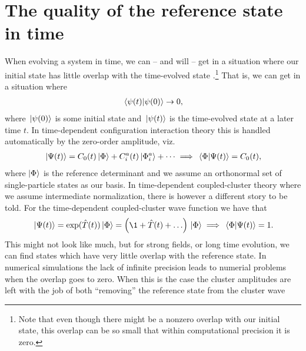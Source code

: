    \section{The quality of the reference state in time}
        \label{sec:cc-phase}
        When evolving a system in time, we can -- and will -- get in a
        situation where our initial state has little overlap with the
        time-evolved state \cite{pedersen2018symplectic}.\footnote{%
            Note that even though there might be a nonzero overlap with our
            initial state, this overlap can be so small that within
            computational precision it is zero.
        }
        That is, we can get in a situation where
        \begin{align}
            \braket*{\psi(t)}{\psi(0)} \to 0,
        \end{align}
        where $\ket*{\psi(0)}$ is some initial state and $\ket*{\psi(t)}$ is
        the time-evolved state at a later time $t$.
        In time-dependent configuration interaction theory this is handled
        automatically by the zero-order amplitude, viz.
        \begin{gather}
            \ket*{\Psi(t)}
            = C_0(t)\ket*{\Phi}
            + C^{a}_{i}(t)\ket*{\Phi^{a}_{i}}
            + \dots
            \implies
            \braket*{\Phi}{\Psi(t)} = C_0(t),
        \end{gather}
        where $\ket{\Phi}$ is the reference determinant and we assume an
        orthonormal set of single-particle states as our basis.
        In time-dependent coupled-cluster theory where we assume
        intermediate normalization, there is however a different story to be
        told.
        For the time-dependent coupled-cluster wave function we have that
        \begin{gather}
            \ket*{\Psi(t)}
            = \exponential(\clust(t))\ket*{\slat}
            = \para{
                \1
                + \clust(t)
                + \dots
            }\ket*{\slat}
            \implies
            \braket*{\slat}{\Psi(t)} = 1.
        \end{gather}
        This might not look like much, but for strong fields, or long
        time evolution, we can find states which have very little overlap
        with the reference state.
        In numerical simulations the lack of infinite precision leads to
        numerial problems when the overlap goes to zero.
        When this is the case the cluster amplitudes are left with the job
        of both ``removing'' the reference state from the cluster wave

